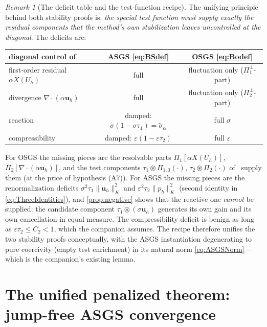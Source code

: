 \documentclass[11pt]{article}
\theoremstyle{remark}
\newtheorem{remark}[theorem]{Remark}
\newcommand{\bu}{\boldsymbol{u}}
\newcommand{\norm}[1]{\lVert #1 \rVert}
\newcommand{\Pone}{\Pi_{1}}
\newcommand{\Ptwo}{\Pi_{2}}
\newcommand{\Poneo}{\Pi_{1}^{\perp}}
\newcommand{\Ptwoo}{\Pi_{2}^{\perp}}
\newcommand{\st}{\widetilde{\sigma}_\alpha}
\begin{document}
\begin{remark}[The deficit table and the test-function recipe]
\label{rem:deficits}
The unifying principle behind both stability proofs is: \emph{the special test
function must supply exactly the residual components that the method's own
stabilization leaves uncontrolled at the diagonal}. The deficits are:
\begin{center}
\begin{tabular}{lcc}
\toprule
diagonal control of & ASGS \cref{eq:BSdef} & OSGS \cref{eq:Bodef} \\
\midrule
first-order residual $\alpha X(U_h)$ & full & fluctuation only
($\Poneo$-part) \\
divergence $\nabla\cdot(\alpha\bu_h)$ & full & fluctuation only
($\Ptwoo$-part) \\
reaction & damped: $\sigma(1-\sigma\tau_1) = \st$ & full $\sigma$ \\
compressibility & damped: $\varepsilon(1-\varepsilon\tau_2)$ & full $\varepsilon$ \\
\bottomrule
\end{tabular}
\end{center}
For OSGS the missing pieces are the resolvable parts $\Pone[\alpha X(U_h)]$,
$\Ptwo[\nabla\cdot(\alpha\bu_h)]$, and the test components
$\tau_1\circledast\Pi_{1,0}(\cdot)$, $\tau_2\circledast\Ptwo(\cdot)$
of~\cite{OSGSnote} supply them (at the price of hypothesis (A7)). For ASGS the
missing pieces are the renormalization deficits $\sigma^2\tau_1\norm{\bu_h}^2_K$ and
$\varepsilon^2\tau_2\norm{p_h}^2_K$ (second identity in \cref{eq:ThreeIdentities}),
and \cref{prop:negative} shows that the reactive one \emph{cannot} be supplied: the
candidate component $\tau_1\circledast(\sigma\bu_h)$ generates its own gain and its
own cancellation in equal measure. The compressibility deficit is benign as long as
$\varepsilon\tau_2 \le C_2 < 1$, which the companion assumes. The recipe therefore
unifies the two stability proofs conceptually, with the ASGS instantiation
degenerating to pure coercivity (empty test enrichment) in its natural norm
\cref{eq:ASGSNorm}---which is the companion's existing lemma.
\end{remark}

\section{The unified penalized theorem: jump-free ASGS convergence}
\label{sec:unified}
\end{document}
